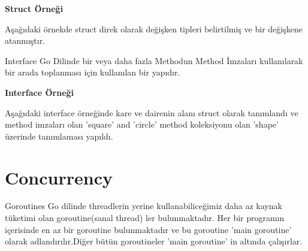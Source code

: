 \vspace{5mm}


\vspace{10mm}

\textbf{Struct Örneği}
\vspace{10mm}

Aşağıdaki örnekde struct direk olarak değişken tipleri belirtilmiş ve bir değişkene atanmıştır.

\vspace{10mm}


\vspace{10mm}

Interface Go Dilinde bir veya daha fazla Methodun Method İmzaları kullanılarak bir arada toplanması için kullanılan bir yapıdır.
\vspace{10mm}



\vspace{10mm}

\textbf{Interface Örneği} 
\vspace{5mm}

Aşağıdaki interface örneğinde kare ve dairenin alanı struct olarak tanımlandı ve method imzaları olan 'square' and 'circle' method koleksiyonu olan 'shape' üzerinde tanımlaması yapıldı.



\vspace{10mm}


\section{Concurrency}
\vspace{5mm}

Goroutines Go dilinde threadlerin yerine kullanabiliceğimiz daha az kaynak tüketimi olan goroutine(sanal thread) ler bulunmaktadır. Her bir programın içerisinde en az bir goroutine bulunmaktadır ve bu goroutine 'main goroutine' olarak adlandırılır.Diğer bütün goroutineler 'main goroutine' in altında çalışırlar.

